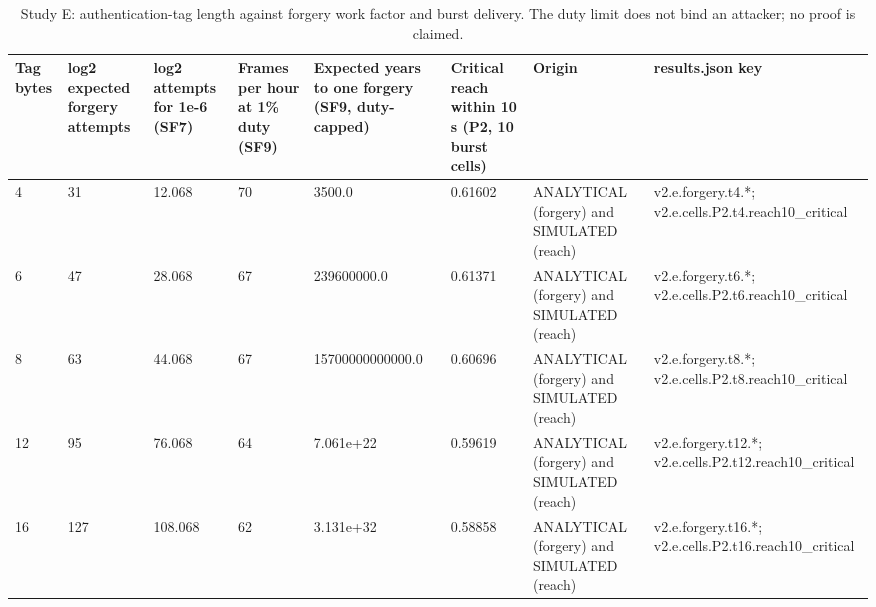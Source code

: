 \begin{table}[t]
\centering
\small
\caption{Study E: authentication-tag length against forgery work factor and burst delivery. The duty limit does not bind an attacker; no proof is claimed.}
\label{tab:v2_tab_tag_length}
\begin{tabular}{llllllll}
\toprule
Tag bytes & log2 expected forgery attempts & log2 attempts for 1e-6 (SF7) & Frames per hour at 1\% duty (SF9) & Expected years to one forgery (SF9, duty-capped) & Critical reach within 10 s (P2, 10 burst cells) & Origin & results.json key \\
\midrule
4 & 31 & 12.068 & 70 & 3500.0 & 0.61602 & ANALYTICAL (forgery) and SIMULATED (reach) & v2.e.forgery.t4.*; v2.e.cells.P2.t4.reach10\_critical \\
6 & 47 & 28.068 & 67 & 239600000.0 & 0.61371 & ANALYTICAL (forgery) and SIMULATED (reach) & v2.e.forgery.t6.*; v2.e.cells.P2.t6.reach10\_critical \\
8 & 63 & 44.068 & 67 & 15700000000000.0 & 0.60696 & ANALYTICAL (forgery) and SIMULATED (reach) & v2.e.forgery.t8.*; v2.e.cells.P2.t8.reach10\_critical \\
12 & 95 & 76.068 & 64 & 7.061e+22 & 0.59619 & ANALYTICAL (forgery) and SIMULATED (reach) & v2.e.forgery.t12.*; v2.e.cells.P2.t12.reach10\_critical \\
16 & 127 & 108.068 & 62 & 3.131e+32 & 0.58858 & ANALYTICAL (forgery) and SIMULATED (reach) & v2.e.forgery.t16.*; v2.e.cells.P2.t16.reach10\_critical \\
\bottomrule
\end{tabular}
\end{table}
